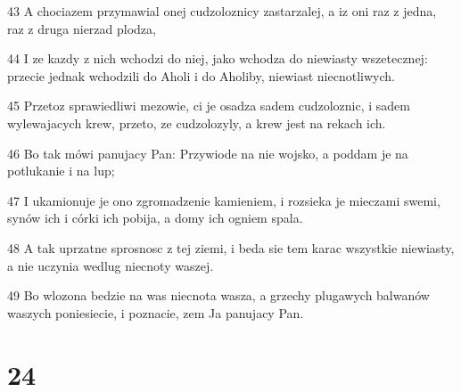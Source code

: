 \par 43 A chociazem przymawial onej cudzoloznicy zastarzalej, a iz oni raz z jedna, raz z druga nierzad plodza,
\par 44 I ze kazdy z nich wchodzi do niej, jako wchodza do niewiasty wszetecznej: przecie jednak wchodzili do Aholi i do Aholiby, niewiast niecnotliwych.
\par 45 Przetoz sprawiedliwi mezowie, ci je osadza sadem cudzoloznic, i sadem wylewajacych krew, przeto, ze cudzolozyly, a krew jest na rekach ich.
\par 46 Bo tak mówi panujacy Pan: Przywiode na nie wojsko, a poddam je na potlukanie i na lup;
\par 47 I ukamionuje je ono zgromadzenie kamieniem, i rozsieka je mieczami swemi, synów ich i córki ich pobija, a domy ich ogniem spala.
\par 48 A tak uprzatne sprosnosc z tej ziemi, i beda sie tem karac wszystkie niewiasty, a nie uczynia wedlug niecnoty waszej.
\par 49 Bo wlozona bedzie na was niecnota wasza, a grzechy plugawych balwanów waszych poniesiecie, i poznacie, zem Ja panujacy Pan.

\chapter{24}

